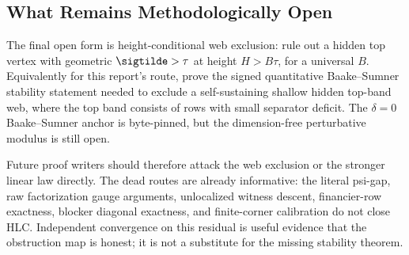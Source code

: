 \subsection{What Remains Methodologically Open}

\begin{openproblem}
\openbadge{} The final open form is height-conditional web exclusion: rule out
a hidden top vertex with geometric $\sigtilde>\tau$ at height $H>B\tau$, for a
universal $B$.  Equivalently for this report's route, prove the signed
quantitative Baake--Sumner stability statement needed to exclude a
self-sustaining shallow hidden top-band web, where the top band consists of
rows with small separator deficit.  The $\delta=0$ Baake--Sumner anchor is
byte-pinned, but the dimension-free perturbative modulus is still open.
\end{openproblem}

Future proof writers should therefore attack the web exclusion or the stronger
linear law directly.  The dead routes are already informative: the literal
psi-gap, raw factorization gauge arguments, unlocalized witness descent,
financier-row exactness, blocker diagonal exactness, and finite-corner
calibration do not close HLC.  Independent convergence on this residual is
useful evidence that the obstruction map is honest; it is not a substitute for
the missing stability theorem.
